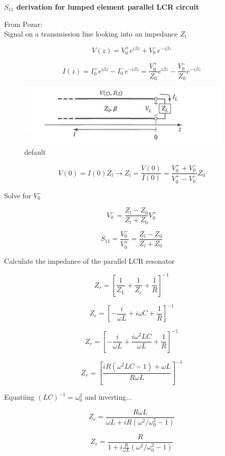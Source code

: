 \documentclass[12pt]{article}
\begin{document}
\setlength{\parindent}{0 pt}

\begin{center}
\textbf{$S_{11}$ derivation for lumped element parallel LCR circuit}
\end{center}

From Pozar: \\
Signal on a transmission line looking into an impedance $Z_l$

\[
V(z) = V_0^+e^{i\beta z} + V_0^-e^{-i \beta z}
\]

\[
I(z) = I_0^+ e^{i\beta z} - I_0^- e^{- i \beta z} = \frac{V_0^+}{Z_0}e^{i\beta z} - \frac{V_0^-}{Z_0}e^{-i \beta z}
\]

\begin{figure}[htbp]
\begin{center}
\includegraphics[scale = .75]{TxLinePozar}
\caption{default}
\label{default}
\end{center}
\end{figure}

\[
V(0) = I(0) Z_l \rightarrow Z_l = \frac{V(0)}{I(0)} = \frac{V_0^+ + V_0^-}{V_0^+ - V_0^-}Z_0
\]

Solve for $V_0^-$


\[
V_0^- = \frac{Z_l - Z_0}{Z_l + Z_0}V_0^+
\]

\[
S_{11} = \frac{V_0^-}{V_0^+} = \frac{Z_l - Z_0}{Z_l + Z_0}
\]

Calculate the impedance of the parallel LCR resonator

\[
Z_r = \left[\frac{1}{Z_L} + \frac{1}{Z_c} + \frac{1}{R}\right]^{-1}
\]

\[
Z_r = \left[-\frac{i}{\omega L} + i \omega C + \frac{1}{R} \right]^{-1}
\]

\[
Z_r = \left[-\frac{i}{\omega L} + \frac{i \omega^2 LC}{\omega L} + \frac{1}{R}\right]^{-1}
\]

\[
Z_r = \left[\frac{i R (\omega^2 LC - 1) + \omega L}{R\omega L}\right]^{-1}
\]

Equatiing $(LC)^{-1} = \omega_0^2$ and inverting...

\[
Z_r = \frac{R\omega L}{\omega L + i R(\omega^2/\omega_0^2 - 1)}
\]

\[
Z_r = \frac{R}{1 + i \frac{R}{\omega L}(\omega^2/\omega_0^2 - 1)}
\]
\end{document}
